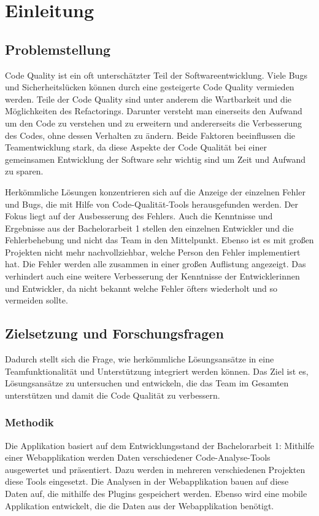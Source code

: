 \chapter{Einleitung}

\section{Problemstellung}
Code Quality ist ein oft unterschätzter Teil der Softwareentwicklung. 
Viele Bugs und Sicherheitslücken können durch eine gesteigerte Code Quality vermieden werden. Teile der Code Quality sind unter anderem die Wartbarkeit und die Möglichkeiten des Refactorings. Darunter versteht man einerseits den Aufwand um den Code zu verstehen und zu erweitern und andererseits die Verbesserung des Codes, ohne dessen Verhalten zu ändern.
Beide Faktoren beeinflussen die Teamentwicklung stark, da diese Aspekte der Code Qualität bei einer gemeinsamen Entwicklung der Software sehr wichtig sind um Zeit und Aufwand zu sparen.

Herkömmliche Lösungen konzentrieren sich auf die Anzeige der einzelnen Fehler und Bugs, die mit Hilfe von Code-Qualität-Tools herausgefunden werden. Der Fokus liegt auf der Ausbesserung des Fehlers. Auch die Kenntnisse und Ergebnisse aus der Bachelorarbeit 1 stellen den einzelnen Entwickler und die Fehlerbehebung und nicht das Team in den Mittelpunkt.
Ebenso ist es mit großen Projekten nicht mehr nachvollziehbar, welche Person den Fehler implementiert hat. Die Fehler werden alle zusammen in einer großen Auflistung angezeigt. Das verhindert auch eine weitere Verbesserung der Kenntnisse der Entwicklerinnen und Entwickler, da nicht bekannt welche Fehler öfters wiederholt und so vermeiden sollte. 

\section{Zielsetzung und Forschungsfragen}

Dadurch stellt sich die Frage, wie herkömmliche Lösungsansätze in eine Teamfunktionalität und Unterstützung integriert werden können. Das Ziel ist es, Lösungsansätze zu untersuchen und entwickeln, die das Team im Gesamten unterstützen und damit die Code Qualität zu verbessern.  

\subsection{Methodik} 
Die Applikation basiert auf dem Entwicklungsstand der Bachelorarbeit 1:
Mithilfe einer Webapplikation werden Daten verschiedener Code-Analyse-Tools ausgewertet und präsentiert. Dazu werden in mehreren verschiedenen Projekten diese Tools eingesetzt. Die Analysen in der Webapplikation bauen auf diese Daten auf, die mithilfe des Plugins gespeichert werden. 
Ebenso wird eine mobile Applikation entwickelt, die die Daten aus der Webapplikation benötigt. 

